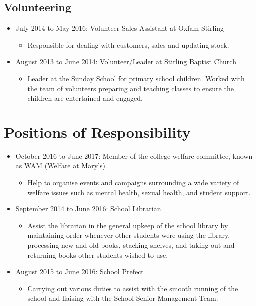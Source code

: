 \documentclass[10pt, a4paper]{article}
\begin{document}
	\subsection{Volunteering}
	\begin{itemize}
		\item July 2014 to May 2016: Volunteer Sales Assistant at Oxfam Stirling
		\begin{itemize}
			\item Responsible for dealing with customers, sales and updating stock.
		\end{itemize}
		\item August 2013 to June 2014: Volunteer/Leader at Stirling Baptist Church
		\begin{itemize}
			\item Leader at the Sunday School for primary school children. Worked with the team of volunteers preparing and teaching classes to ensure the children are entertained and engaged.
		\end{itemize}
	\end{itemize}

\section{Positions of Responsibility}
\begin{itemize}
	\item October 2016 to June 2017: Member of the college welfare committee, known as WAM (Welfare at Mary's)
	\begin{itemize}
		\item Help to organise events and campaigns surrounding a wide variety of welfare issues such as mental health, sexual health, and student support.
	\end{itemize}
	\item September 2014 to June 2016: School Librarian
	\begin{itemize}
		\item Assist the librarian in the general upkeep of the school library by maintaining order whenever other students were using the library, processing new and old books, stacking shelves, and taking out and returning books other students wished to use.
	\end{itemize}
	\item August 2015 to June 2016: School Prefect
	\begin{itemize}
		\item Carrying out various duties to assist with the smooth running of the school and liaising with the School Senior Management Team.
	\end{itemize}
\end{itemize}
\end{document}
